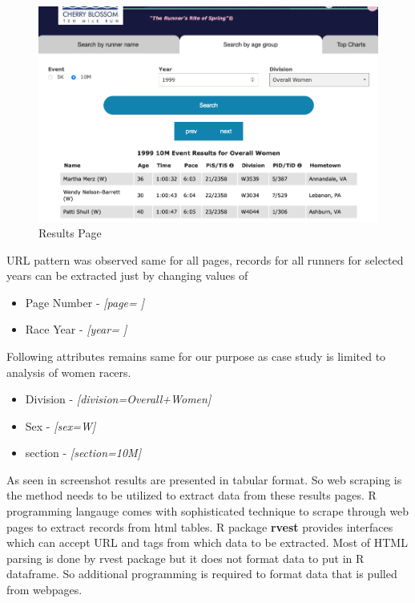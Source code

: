 \documentclass[
]{article}
\providecommand{\tightlist}{%
  \setlength{\itemsep}{0pt}\setlength{\parskip}{0pt}}
\begin{document}
\begin{figure}[H]

{\centering \includegraphics[width=1\linewidth,height=1\textheight,]{images/results_page} 

}

\caption{Results Page}\label{fig:unnamed-chunk-3}
\end{figure}

URL pattern was observed same for all pages, records for all runners for
selected years can be extracted just by changing values of

\begin{itemize}
\tightlist
\item
  Page Number - \emph{{[}page= {]}}
\item
  Race Year - \emph{{[}year= {]}}
\end{itemize}

Following attributes remains same for our purpose as case study is
limited to analysis of women racers.

\begin{itemize}
\tightlist
\item
  Division - \emph{{[}division=Overall+Women{]}}
\item
  Sex - \emph{{[}sex=W{]}}
\item
  section - \emph{{[}section=10M{]}}
\end{itemize}

As seen in screenshot results are presented in tabular format. So web
scraping is the method needs to be utilized to extract data from these
results pages. R programming langauge comes with sophisticated technique
to scrape through web pages to extract records from html tables. R
package \textbf{rvest} provides interfaces which can accept URL and tags
from which data to be extracted. Most of HTML parsing is done by rvest
package but it does not format data to put in R dataframe. So additional
programming is required to format data that is pulled from webpages.
\end{document}
